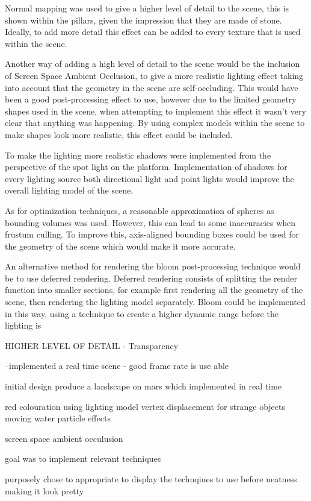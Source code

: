 \documentclass[conference]{acmsiggraph}
\begin{document}
Normal mapping was used to give a higher level of detail to the scene, this is shown within the pillars, given the impression that they are made of stone. Ideally, to add more detail this effect can be added to every texture that is used within the scene.

Another way of adding a high level of detail to the scene would be the inclusion of Screen Space Ambient Occlusion, to give a more realistic lighting effect taking into account that the geometry in the scene are self-occluding. This would have been a good post-processing effect to use, however due to the limited geometry shapes used in the scene, when attempting to implement this effect it wasn't very clear that anything was happening. By using complex models within the scene to make shapes look more realistic, this effect could be included.

To make the lighting more realistic shadows were implemented from the perspective of the spot light on the platform. Implementation of shadows for every lighting source both directional light and point lights would improve the overall lighting model of the scene.

As for optimization techniques, a reasonable approximation of spheres as bounding volumes was used. However, this can lead to some inaccuracies when frustum culling. To improve this, axis-aligned bounding boxes could be used for the geometry of the scene which would make it more accurate.

An alternative method for rendering the bloom post-processing technique would be to use deferred rendering. Deferred rendering consists of splitting the render function into smaller sections, for example first rendering all the geometry of the scene, then rendering the lighting model separately. Bloom could be implemented in this way, using a technique to create a higher dynamic range before the lighting is 

HIGHER LEVEL OF DETAIL - Transparency

--implemented a real time scene - good frame rate is use able

initial design produce a landscape on mars which implemented in real time 

red colouration using lighting model
vertex displacement for strange objects
moving water
particle effects

screen space ambient occulusion

goal was to implement relevant techniques 

purposely chose to appropriate to display the technqiues to use
before neatness making it look pretty
\end{document}
